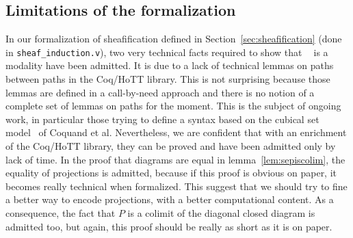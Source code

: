 \documentclass[conference]{IEEEtran}
\DeclareMathOperator{\IsHProp}{IsHProp}
\DeclareMathOperator{\id}{id}
\newcommand \separated {\mathop{\square_{n+1}} }
\begin{document}

\subsection{Limitations of the formalization}
\label{sec:limit-form}

In our formalization of sheafification defined in
Section~\ref{sec:sheafification} (done in 
\texttt{sheaf\_induction.v}), two very technical facts required to
show that $\separated$ is a modality have been
admitted. 
%
It is due to a lack of technical lemmas on paths between paths in
the Coq/HoTT library.
%
This is not surprising because those lemmas are defined in a
call-by-need approach and there is no notion of a complete set of
lemmas on paths for the moment. 
%
This is the subject of ongoing work, in particular those trying to
define a syntax based on the cubical set model~\cite{bezem2013model}
of Coquand et al.  
%
Nevertheless, we are confident that with an enrichment of the Coq/HoTT
library, they can be proved and have been admitted only by lack of
time.
%
In the proof that diagrams are equal in lemma~\ref{lem:sepiscolim},
the equality of projections is admitted, because if this proof is
obvious on paper, it becomes really technical when formalized.
%
This suggest that we should try to fine a better way to encode
projections, with a better computational content.
%
As a consequence, the fact that $P$ is a colimit of the diagonal
closed diagram is admitted too, but again, this proof should be really
as short as it is on paper.
\end{document}
